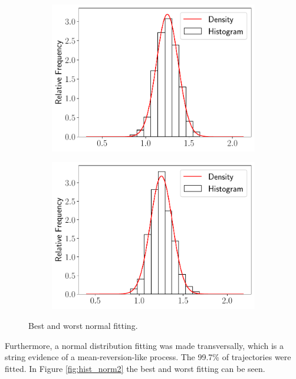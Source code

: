 \documentclass[11pt]{article}
\theoremstyle{definition}
\theoremstyle{remark}
\theoremstyle{remark}
\begin{document}
\begin{figure}[H]
  \centering
  \begin{subfigure}[b]{0.45\textwidth}
    \centering
    \includegraphics[scale=.45]{maxp_norm_histogram_eachT}
  \end{subfigure}
    \begin{subfigure}[b]{0.45\textwidth}
    \centering
    \includegraphics[scale=.45]{minp_norm_histogram_eachT}
  \end{subfigure}
  \caption{Best and worst normal fitting.}
  \label{fig:hist_norm}
\end{figure}

Furthermore, a normal distribution fitting was made transversally, which is a
string evidence of a mean-reversion-like process. The
99.7\% of trajectories were fitted. In Figure \ref{fig:hist_norm2} the
best and worst fitting can be seen.
\end{document}
